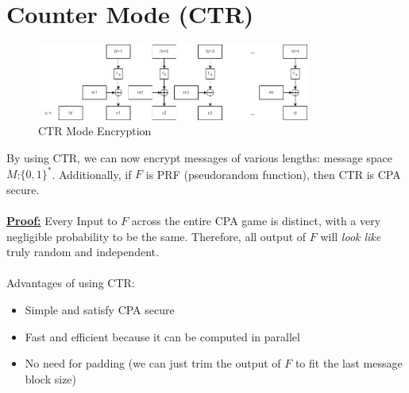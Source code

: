 \documentclass{scribe}
\begin{document}
\maketitle


\section{Counter Mode (CTR)}

\begin{figure}[h]
  \centering
  \includegraphics[width=0.8\textwidth]{ctr.jpg}
  \caption{CTR Mode Encryption}
\end{figure}
By using CTR, we can now encrypt messages of various lengths: message space $M$:$\{0,1\}^{*}$. Additionally, if $F$ is PRF (pseudorandom function), then CTR is CPA secure.
\\
\\\underline{\textbf{Proof:}} Every Input to $F$ across the entire CPA game is distinct, with a very negligible probability to be the same. Therefore, all output of $F$ will \emph{look like} truly random and independent.
\\
\\Advantages of using CTR:
\begin{itemize}
  \item Simple and satisfy CPA secure
  \item Fast and efficient because it can be computed in parallel
  \item No need for padding (we can just trim the output of $F$ to fit the last message block size)
\end{itemize}

\end{document}
